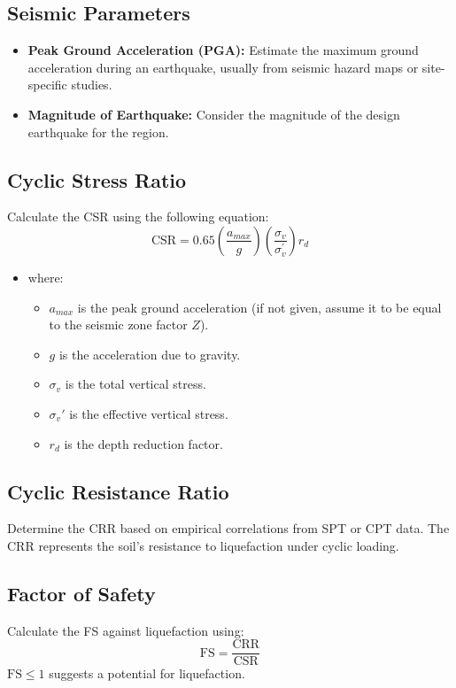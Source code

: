 \subsection{Seismic Parameters}
\begin{itemize}
    \item \textbf{Peak Ground Acceleration (PGA):} Estimate the maximum ground acceleration during an earthquake, usually from seismic hazard maps or site-specific studies.
    \item \textbf{Magnitude of Earthquake:} Consider the magnitude of the design earthquake for the region.
\end{itemize}

\subsection{Cyclic Stress Ratio}
Calculate the CSR using the following equation:
\begin{equation}
    \mathrm{CSR} = 0.65 \left( \frac{a_{max}}{g} \right) \left( \frac{\sigma_v}{\sigma_v^{'}} \right) r_d
\end{equation}

\begin{itemize}
    \item where:
    \begin{itemize}
        \item \(a_{max}\) is the peak ground acceleration (if not given, assume it to be equal to the seismic zone factor \(Z\)).
        \item \(g\) is the acceleration due to gravity.
        \item \(\sigma_v\) is the total vertical stress.
        \item \(\sigma_v'\) is the effective vertical stress.
        \item \(r_d\) is the depth reduction factor.
    \end{itemize}
\end{itemize}

\subsection{Cyclic Resistance Ratio}
Determine the CRR based on empirical correlations from SPT or CPT data. The CRR represents the soil's resistance to liquefaction under cyclic loading.

\subsection{Factor of Safety}
Calculate the FS against liquefaction using:
\begin{equation}
    \mathrm{FS} = \frac{\mathrm{CRR}}{\mathrm{CSR}}
\end{equation}
\(\mathrm{FS} \leq 1\) suggests a potential for liquefaction.
